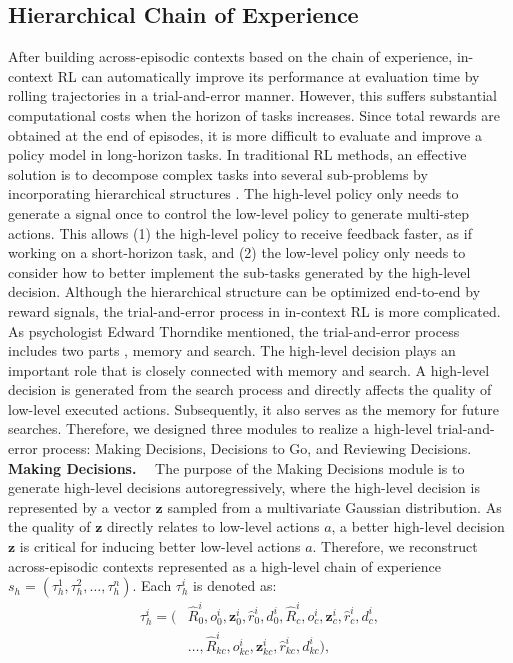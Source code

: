 \documentclass{article}
\theoremstyle{plain}
\theoremstyle{definition}
\theoremstyle{remark}
\begin{document}
\subsection{Hierarchical Chain of Experience}
After building across-episodic contexts based on the chain of experience, in-context RL can automatically improve its performance at evaluation time by rolling trajectories in a trial-and-error manner. However, this suffers substantial computational costs when the horizon of tasks increases.
Since total rewards are obtained at the end of episodes, it is more difficult to evaluate and improve a policy model in long-horizon tasks. In traditional RL methods, an effective solution is to decompose complex tasks into several sub-problems by incorporating hierarchical structures  \cite{10}. The high-level policy only needs to generate a signal once to control the low-level policy to generate multi-step actions. This allows (1) the high-level policy to receive feedback faster, as if working on a short-horizon task, and (2) the low-level policy only needs to consider how to better implement the sub-tasks generated by the high-level decision. Although the hierarchical structure can be optimized end-to-end by reward signals, the trial-and-error process in in-context RL is more complicated.
As psychologist Edward Thorndike mentioned, the trial-and-error process includes two parts \cite{16}, memory and search. The high-level decision plays an important role that is closely connected with memory and search. A high-level decision is generated from the search process and directly affects the quality of low-level executed actions. Subsequently, it also serves as the memory for future searches. Therefore, we designed three modules to realize a high-level trial-and-error process: Making Decisions, Decisions to Go, and Reviewing Decisions.
\noindent\textbf{Making Decisions.}~~
The purpose of the Making Decisions module is to generate high-level decisions autoregressively, where the high-level decision is represented by a vector $\textbf{z}$ sampled from a multivariate Gaussian distribution. As the quality of $\textbf{z}$ directly relates to low-level actions $a$, a better high-level decision $\textbf{z}$ is critical for inducing better low-level actions $a$. Therefore, we reconstruct across-episodic contexts represented as a high-level chain of experience $s_h=(\tau_h^{1},\tau_h^{2},\dots,\tau_h^{n})$. Each $\tau_h^{i}$ is denoted as:
\begin{equation}
\begin{aligned}
\tau_h^{i}=(&\hat{R}_0^i,o_0^i,\textbf{z}_0^i,\hat{r}_0^i,d_0^i,\hat{R}_{c}^i,o_{c}^i,\textbf{z}_{c}^i,\hat{r}_{c}^i,d_{c}^i,\\
&\dots,\hat{R}_{kc}^i,o_{kc}^i,\textbf{z}_{kc}^i,\hat{r}_{kc}^i,d_{kc}^i),
\label{hcoe}
\end{aligned}
\end{equation}
\end{document}

